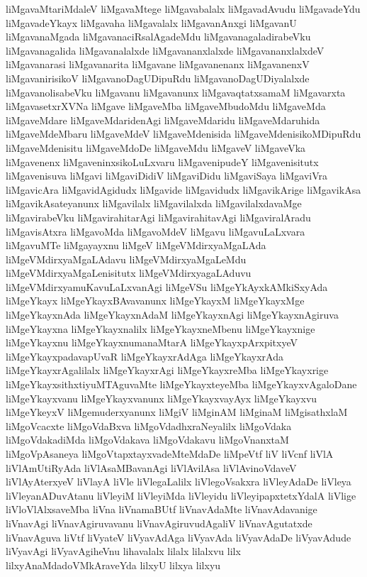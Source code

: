 {liMgavaMtariMdaleV
liMgavaMtege
liMgavabalalx
liMgavadAvudu
liMgavadeYdu
liMgavadeYkayx
liMgavaha
liMgavalalx
liMgavanAnxgi
liMgavanU
liMgavanaMgada
liMgavanaciRsalAgadeMdu
liMgavanagaladirabeVku
liMgavanagalida
liMgavanalalxde
liMgavananxlalxde
liMgavananxlalxdeV
liMgavanarasi
liMgavanarita
liMgavane
liMgavanenanx
liMgavanenxV
liMgavanirisikoV
liMgavanoDagUDipuRdu
liMgavanoDagUDiyalalxde
liMgavanolisabeVku
liMgavanu
liMgavanunx
liMgavaqtatxsamaM
liMgavarxta
liMgavasetxrXVNa
liMgave
liMgaveMba
liMgaveMbudoMdu
liMgaveMda
liMgaveMdare
liMgaveMdaridenAgi
liMgaveMdaridu
liMgaveMdaruhida
liMgaveMdeMbaru
liMgaveMdeV
liMgaveMdenisida
liMgaveMdenisikoMDipuRdu
liMgaveMdenisitu
liMgaveMdoDe
liMgaveMdu
liMgaveV
liMgaveVka
liMgavenenx
liMgaveninxsikoLuLxvaru
liMgavenipudeY
liMgavenisitutx
liMgavenisuva
liMgavi
liMgaviDidiV
liMgaviDidu
liMgaviSaya
liMgaviVra
liMgavicAra
liMgavidAgidudx
liMgavide
liMgavidudx
liMgavikArige
liMgavikAsa
liMgavikAsateyanunx
liMgavilalx
liMgavilalxda
liMgavilalxdavaMge
liMgavirabeVku
liMgavirahitarAgi
liMgavirahitavAgi
liMgaviralAradu
liMgavisAtxra
liMgavoMda
liMgavoMdeV
liMgavu
liMgavuLaLxvara
liMgavuMTe
liMgayayxnu
liMgeV
liMgeVMdirxyaMgaLAda
liMgeVMdirxyaMgaLAdavu
liMgeVMdirxyaMgaLeMdu
liMgeVMdirxyaMgaLenisitutx
liMgeVMdirxyagaLAduvu
liMgeVMdirxyamuKavuLaLxvanAgi
liMgeVSu
liMgeYkAyxkAMkiSxyAda
liMgeYkayx
liMgeYkayxBAvavanunx
liMgeYkayxM
liMgeYkayxMge
liMgeYkayxnAda
liMgeYkayxnAdaM
liMgeYkayxnAgi
liMgeYkayxnAgiruva
liMgeYkayxna
liMgeYkayxnalilx
liMgeYkayxneMbenu
liMgeYkayxnige
liMgeYkayxnu
liMgeYkayxnumanaMtarA
liMgeYkayxpArxpitxyeV
liMgeYkayxpadavapUvaR
liMgeYkayxrAdAga
liMgeYkayxrAda
liMgeYkayxrAgalilalx
liMgeYkayxrAgi
liMgeYkayxreMba
liMgeYkayxrige
liMgeYkayxsithxtiyuMTAguvaMte
liMgeYkayxteyeMba
liMgeYkayxvAgaloDane
liMgeYkayxvanu
liMgeYkayxvanunx
liMgeYkayxvayAyx
liMgeYkayxvu
liMgeYkeyxV
liMgemuderxyanunx
liMgiV
liMginAM
liMginaM
liMgisathxlaM
liMgoVcacxte
liMgoVdaBxva
liMgoVdadhxraNeyalilx
liMgoVdaka
liMgoVdakadiMda
liMgoVdakava
liMgoVdakavu
liMgoVnanxtaM
liMgoVpAsaneya
liMgoVtapxtayxvadeMteMdaDe
liMpeVtf
liV
liVcnf
liVlA
liVlAmUtiRyAda
liVlAsaMBavanAgi
liVlAvilAsa
liVlAvinoVdaveV
liVlAyAterxyeV
liVlayA
liVle
liVlegaLalilx
liVlegoVsakxra
liVleyAdaDe
liVleya
liVleyanADuvAtanu
liVleyiM
liVleyiMda
liVleyidu
liVleyipapxtetxYdalA
liVlige
liVloVlAlxsaveMba
liVna
liVnamaBUtf
liVnavAdaMte
liVnavAdavanige
liVnavAgi
liVnavAgiruvavanu
liVnavAgiruvudAgaliV
liVnavAgutatxde
liVnavAguva
liVtf
liVyateV
liVyavAdAga
liVyavAda
liVyavAdaDe
liVyavAdude
liVyavAgi
liVyavAgiheVnu
lihavalalx
lilalx
lilalxvu
lilx
lilxyAnaMdadoVMkAraveYda
lilxyU
lilxya
lilxyu
}
